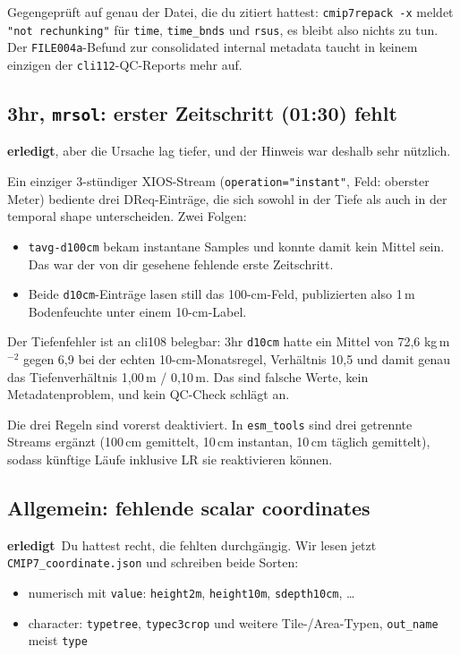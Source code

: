 \documentclass[11pt,a4paper]{article}
\newcommand{\code}[1]{\texttt{\small #1}}
\newcommand{\ok}{\textcolor{green!45!black}{\textbf{erledigt}}}
\begin{document}
Gegengepr\"uft auf genau der Datei, die du zitiert hattest:
\code{cmip7repack -x} meldet \code{"not rechunking"} f\"ur \code{time},
\code{time\_bnds} und \code{rsus}, es bleibt also nichts zu tun. Der
\code{FILE004a}-Befund zur consolidated internal metadata taucht in keinem
einzigen der \code{cli112}-QC-Reports mehr auf.

\subsection*{3hr, \code{mrsol}: erster Zeitschritt (01:30) fehlt}
\ok, aber die Ursache lag tiefer, und der Hinweis war deshalb sehr n\"utzlich.

Ein einziger 3-st\"undiger XIOS-Stream (\code{operation="instant"}, Feld: oberster
Meter) bediente drei DReq-Eintr\"age, die sich sowohl in der Tiefe als auch in der
temporal shape unterscheiden. Zwei Folgen:

\begin{itemize}
\item \code{tavg-d100cm} bekam instantane Samples und konnte damit kein Mittel sein.
      Das war der von dir gesehene fehlende erste Zeitschritt.
\item Beide \code{d10cm}-Eintr\"age lasen still das 100-cm-Feld, publizierten also
      1\,m Bodenfeuchte unter einem 10-cm-Label.
\end{itemize}

Der Tiefenfehler ist an cli108 belegbar: 3hr \code{d10cm} hatte ein Mittel von
72{,}6 kg\,m$^{-2}$ gegen 6{,}9 bei der echten 10-cm-Monatsregel, Verh\"altnis
10{,}5 und damit genau das Tiefenverh\"altnis 1{,}00\,m / 0{,}10\,m. Das sind falsche
Werte, kein Metadatenproblem, und kein QC-Check schl\"agt an.

Die drei Regeln sind vorerst deaktiviert. In \code{esm\_tools} sind drei getrennte
Streams erg\"anzt (100\,cm gemittelt, 10\,cm instantan, 10\,cm t\"aglich gemittelt),
sodass k\"unftige L\"aufe inklusive LR sie reaktivieren k\"onnen.

\subsection*{Allgemein: fehlende scalar coordinates}
\ok\ Du hattest recht, die fehlten durchg\"angig. Wir lesen jetzt
\code{CMIP7\_coordinate.json} und schreiben beide Sorten:

\begin{itemize}
\item numerisch mit \code{value}: \code{height2m}, \code{height10m}, \code{sdepth10cm}, \dots
\item character: \code{typetree}, \code{typec3crop} und weitere Tile-/Area-Typen,
      \code{out\_name} meist \code{type}
\end{itemize}
\end{document}
